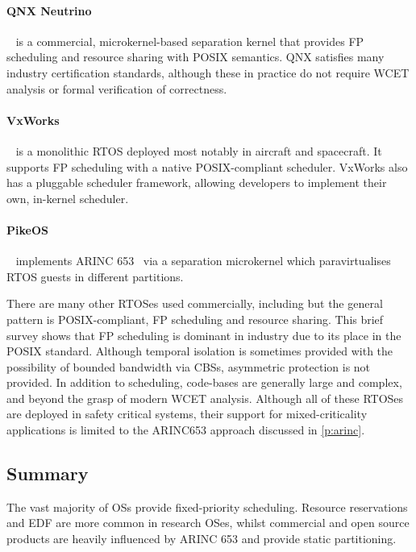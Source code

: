 \paragraph{QNX Neutrino}~\citep{QNX_10} is a commercial, microkernel-based separation kernel that provides
\gls{FP} scheduling and resource sharing with POSIX semantics.  QNX satisfies many industry
certification standards, although these in practice do not require {\gls{WCET}} analysis or formal
verification of correctness.

\paragraph{VxWorks}~\citep{VxWorks_08} is a monolithic \gls{RTOS} deployed most notably in aircraft
and spacecraft.  It supports \gls{FP} scheduling with a native POSIX-compliant scheduler.  VxWorks
also has a pluggable scheduler framework, allowing developers to implement their own, in-kernel
scheduler.

\paragraph{PikeOS}~\citep{PikeOS:URL} implements ARINC 653~\citep{ARINC653} via a separation
microkernel which paravirtualises RTOS guests in different partitions.

There are many other \gls{RTOS}es used commercially, including \citet{Deos:URL} but the general pattern is POSIX-compliant, \gls{FP} scheduling and resource sharing.
This brief survey shows that \gls{FP} scheduling is dominant in industry due to its place in the POSIX standard. 
Although temporal isolation is sometimes provided with the possibility of bounded bandwidth via
\glspl{CBS}, asymmetric protection is not provided.  In addition to scheduling, code-bases are
generally large and complex, and beyond the grasp of modern {\gls{WCET}} analysis.  Although all of
these \gls{RTOS}es are deployed in safety critical systems, their support for mixed-criticality
applications is limited to the ARINC653 approach discussed in \cref{p:arinc}. 

\subsection{Summary}

The vast majority of \glspl{OS} provide fixed-priority scheduling. Resource reservations and
\gls{EDF} are more common in research OSes, whilst commercial and open source products are heavily
influenced by ARINC 653 and provide static partitioning. 

